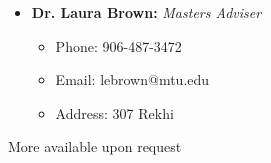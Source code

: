\documentclass[11pt,a4paper,sans]{moderncv}        %
\begin{document}
\begin{itemize}
\vspace{6pt}

\item{\textbf{Dr. Laura Brown:} \textit{Masters Adviser}

\vspace{3pt}

\small{
\begin{itemize}
\item Phone: 906-487-3472
\item Email: lebrown@mtu.edu
\item Address: 307 Rekhi
\end{itemize}
}}

\end{itemize}

\vspace{6pt}

More available upon request
\end{document}
